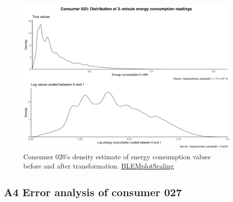 \begin{centering}
\begin{figure}[!htbp]
        \includegraphics[width=\textwidth-0.85cm]{thesis/graphs/c020_density.pdf}
        \caption[Energy consumption distribution before and after transformation]{Consumer 020's density estimate of energy consumption values before and after transformation. \quantnet\href{ }{BLEMplotScaling}}
\end{figure}
\end{centering}




\subsection*{\hypertarget{AppA4:Figures:erroranalysis}{A4} Error analysis of consumer 027}\label{AppA4:Figures:erroranalysis}

